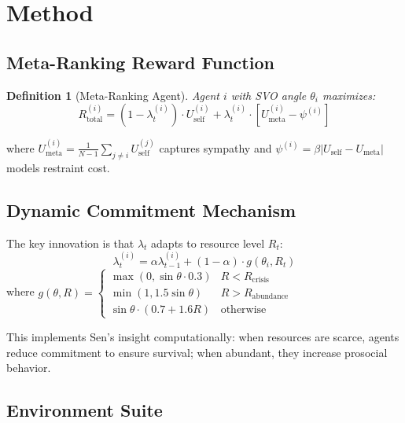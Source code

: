 \documentclass{article}
\newtheorem{definition}{Definition}
\begin{document}
\section{Method}
\label{sec:method}

\subsection{Meta-Ranking Reward Function}

\begin{definition}[Meta-Ranking Agent]
Agent $i$ with SVO angle $\theta_i$ maximizes:
\begin{equation}
R_{\text{total}}^{(i)} = (1 - \lambda_t^{(i)}) \cdot U_{\text{self}}^{(i)} + \lambda_t^{(i)} \cdot \left[ U_{\text{meta}}^{(i)} - \psi^{(i)} \right]
\label{eq:reward}
\end{equation}
\end{definition}
where $U_{\text{meta}}^{(i)} = \frac{1}{N-1}\sum_{j \neq i} U_{\text{self}}^{(j)}$ captures sympathy and $\psi^{(i)} = \beta |U_{\text{self}} - U_{\text{meta}}|$ models restraint cost.

\subsection{Dynamic Commitment Mechanism}

The key innovation is that $\lambda_t$ adapts to resource level $R_t$:
\begin{equation}
\lambda_t^{(i)} = \alpha \lambda_{t-1}^{(i)} + (1-\alpha) \cdot g(\theta_i, R_t)
\label{eq:lambda}
\end{equation}
where $g(\theta, R) = \begin{cases}
\max(0, \sin\theta \cdot 0.3) & R < R_{\text{crisis}} \\
\min(1, 1.5\sin\theta) & R > R_{\text{abundance}} \\
\sin\theta \cdot (0.7 + 1.6R) & \text{otherwise}
\end{cases}$

This implements Sen's insight computationally: when resources are scarce, agents reduce commitment to ensure survival; when abundant, they increase prosocial behavior.

\subsection{Environment Suite}
\label{sec:env}
\end{document}
